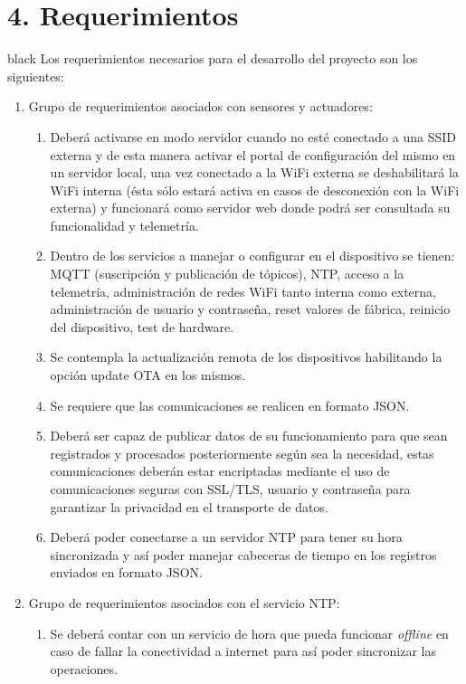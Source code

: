 \documentclass[11pt]{charter}
\begin{document}
\section{4. Requerimientos}
\label{sec:requerimientos}

\begin{consigna}{black}
Los requerimientos necesarios para el desarrollo del proyecto son los siguientes:
\begin{enumerate}
\item Grupo de requerimientos asociados con sensores y actuadores:
	\begin{enumerate}
		\item Deberá activarse en modo servidor cuando no esté conectado a una SSID externa y de esta manera activar el portal de configuración del mismo en un servidor local, una vez conectado a la WiFi externa se deshabilitará la WiFi interna (ésta sólo estará activa en casos de desconexión con la WiFi externa) y funcionará como servidor web donde podrá ser consultada su funcionalidad y telemetría.
		\item Dentro de los servicios a manejar o configurar en el dispositivo se tienen: MQTT (suscripción y publicación de tópicos), NTP, acceso a la telemetría, administración de redes WiFi tanto interna como externa, administración de usuario y contraseña, reset valores de fábrica, reinicio del dispositivo, test de hardware.
		\item Se contempla la actualización remota de los dispositivos habilitando la opción update OTA en los mismos.
		\item Se requiere que las comunicaciones se realicen en formato JSON.
		\item Deberá ser capaz de publicar datos de su funcionamiento para que sean registrados y procesados posteriormente según sea la necesidad, estas comunicaciones deberán estar encriptadas mediante el uso de comunicaciones seguras con SSL/TLS, usuario y contraseña para garantizar la privacidad en el transporte de datos.
		\item Deberá poder conectarse a un servidor NTP para tener su hora sincronizada y así poder manejar cabeceras de tiempo en los registros enviados en formato JSON.
	\end{enumerate}
\item Grupo de requerimientos asociados con el servicio NTP:
	\begin{enumerate}
		\item Se deberá contar con un servicio de hora que pueda funcionar \emph{offline} en caso de fallar la conectividad a internet para así poder sincronizar las operaciones.

\end{enumerate}
\end{enumerate}
\end{consigna}
\end{document}
